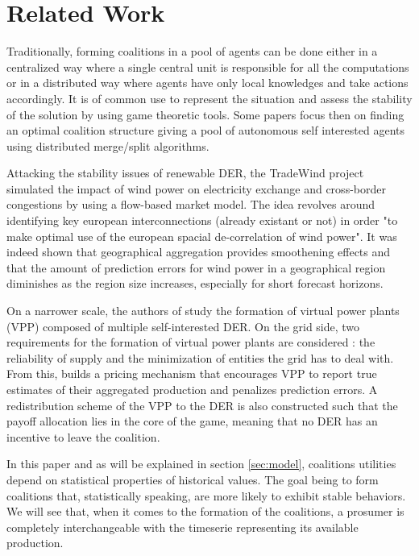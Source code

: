 \documentclass[conference]{IEEEtran}
\begin{document}
\section{Related Work}
\label{sec:related}

Traditionally, forming coalitions in a pool of agents can be done either in a centralized way where a single central unit is responsible for all the computations or in a distributed way where agents have only local knowledges and take actions accordingly. It is of common use to represent the situation and assess the stability of the solution by using game theoretic tools. Some papers \cite{Saad2009} \cite{Luan2014} focus then on finding an optimal coalition structure giving a pool of autonomous self interested agents using distributed merge/split algorithms.

Attacking the stability issues of renewable DER, the TradeWind project \cite{Europe} simulated the impact of wind power on electricity exchange and cross-border congestions by using a flow-based market model. The idea revolves around identifying key european interconnections (already existant or not) in order "to make optimal use of the european spacial de-correlation of wind power". It was indeed shown that geographical aggregation provides smoothening effects and that the amount of prediction errors for wind power in a geographical region diminishes as the region size increases, especially for short forecast horizons.

On a narrower scale, the authors of \cite{Kota2011} study the formation of virtual power plants (VPP) composed of multiple self-interested DER. On the grid side, two requirements for the formation of virtual power plants are considered : the reliability of supply and the minimization of entities the grid has to deal with. From this, \cite{Kota2011} builds a pricing mechanism that encourages VPP to report true estimates of their aggregated production and penalizes prediction errors. A redistribution scheme of the VPP to the DER is also constructed such that the payoff allocation lies in the core of the game, meaning that no DER has an incentive to leave the coalition.

In this paper and as will be explained in section \ref{sec:model}, coalitions utilities depend on statistical properties of historical values. The goal being to form coalitions that, statistically speaking, are more likely to exhibit stable behaviors. We will see that, when it comes to the formation of the coalitions, a prosumer is completely interchangeable with the timeserie representing its available production.
\end{document}
